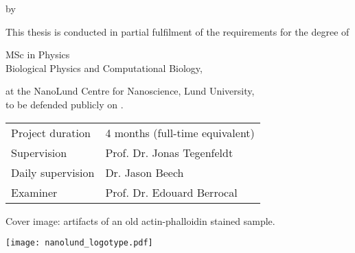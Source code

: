 {
\pagestyle{empty}


\clearpage

\begin{titlepage}
	
	\frutigerfont
	
	\begin{center}

		
		{\Huge \garamondfont \thetitle}
		
		\smallskip
		by
		\bigskip
		
		{\Large \garamondfont \theauthor}
		
		\bigskip
		\bigskip
		
		This thesis is conducted in partial fulfilment of the requirements for the degree of 
		
		\bigskip
		
		{MSc in Physics} \\
		Biological Physics and Computational Biology,
		
		\bigskip
		
		at the NanoLund Centre for Nanoscience, Lund University,\\
		to be defended publicly on .
		
		
		\vspace{5cm}
		
		\vfill
		\begin{tabular}{ll}
			Project duration & 4 months (full-time equivalent)\\
			Supervision & Prof. Dr. Jonas Tegenfeldt\\
			Daily supervision & Dr. Jason Beech\\
			Examiner & Prof. Dr. Edouard Berrocal
		\end{tabular}
	
		\bigskip
	
		Cover image: artifacts of an old actin-phalloidin stained sample.
	
		\vspace{2cm}
		
		\texttt{[image: nanolund\_logotype.pdf]}
	
	
	\end{center}
\end{titlepage}

%
%
%
%
%
%
%
%

}